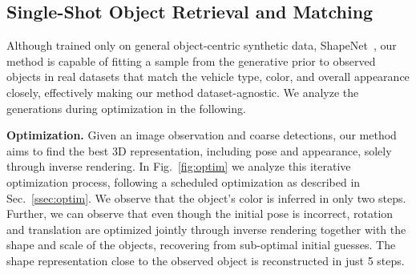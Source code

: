 \subsection{Single-Shot Object Retrieval and Matching}
Although trained only on general object-centric synthetic data, ShapeNet~\cite{shapenet2015}, our method is capable of fitting a sample from the generative prior to observed objects in real datasets that match the vehicle type, color, and overall appearance closely, effectively making our method dataset-agnostic. 
We analyze the generations during optimization in the following.

\vspace{0.5\baselineskip}
\noindent
\textbf{Optimization.} Given an image observation and coarse detections, our method aims to find the best 3D representation, including pose and appearance, solely through inverse rendering. In Fig.~\ref{fig:optim} we analyze this iterative optimization process, following a scheduled optimization as described in Sec.~\ref{ssec:optim}. We observe that the object's color is inferred in only two steps. Further, we can observe that even though the initial pose is incorrect, rotation and translation are optimized jointly through inverse rendering together with the shape and scale of the objects, recovering from sub-optimal initial guesses. The shape representation close to the observed object is reconstructed in just 5 steps. 


 



